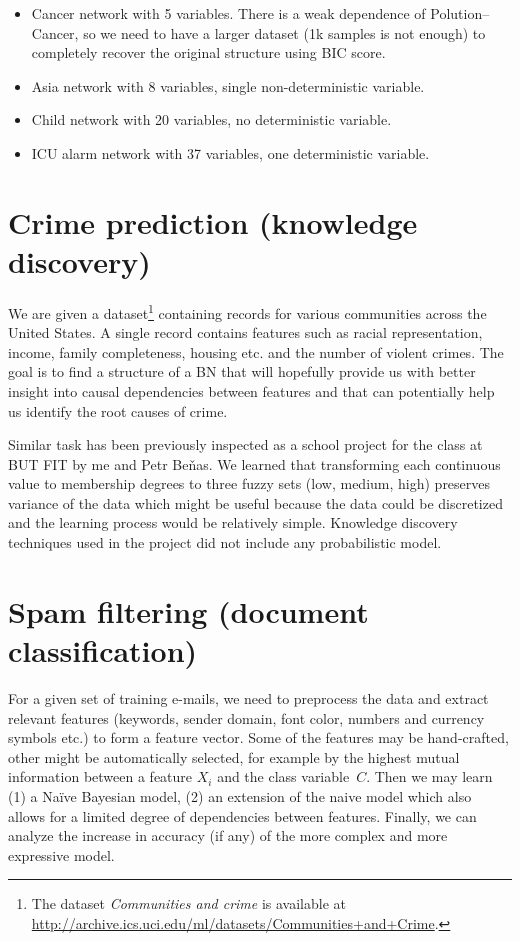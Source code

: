\documentclass[english,cover]{fitthesis} %
\begin{document}
\begin{itemize}
	\item Cancer network with 5 variables. There is a weak dependence of Polution--Cancer, so we need to have a larger dataset (1k samples is not enough) to completely recover the original structure using BIC score.
	\item Asia network with 8 variables, single non-deterministic variable.
	\item Child network with 20 variables, no deterministic variable.
	\item ICU alarm network with 37 variables, one deterministic variable.
\end{itemize}




\section{Crime prediction (knowledge discovery)}
We are given a dataset\footnote{The dataset \emph{Communities and crime} is available at \url{http://archive.ics.uci.edu/ml/datasets/Communities+and+Crime}.} containing records for various communities across the United States. A single record contains features such as racial representation, income, family completeness, housing etc. and the number of violent crimes. The goal is to find a structure of a BN that will hopefully provide us with better insight into causal dependencies between features and that can potentially help us identify the root causes of crime.

Similar task has been previously inspected as a school project for the  class at BUT FIT by me and Petr Beňas. We learned that transforming each continuous value to membership degrees to three fuzzy sets (low, medium, high) preserves variance of the data which might be useful because the data could be discretized and the learning process would be relatively simple. Knowledge discovery techniques used in the project did not include any probabilistic model.


\section{Spam filtering (document classification)}
For a given set of training e-mails, we need to preprocess the data and extract relevant features (keywords, sender domain, font color, numbers and currency symbols etc.) to form a feature vector. Some of the features may be hand-crafted, other might be automatically selected, for example by the highest mutual information between a feature $X_i$ and the class variable~$C$. Then we may learn (1) a Naïve Bayesian model, (2) an extension of the naive model which also allows for a limited degree of dependencies between features. Finally, we can analyze the increase in accuracy (if any) of the more complex and more expressive model.
\end{document}
